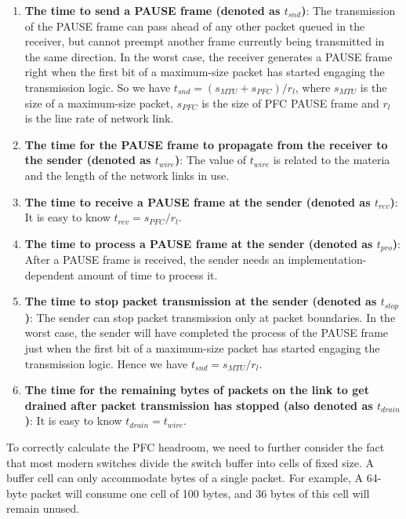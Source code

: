\begin{enumerate}
	
\item\textbf{The time to send a PAUSE frame (denoted as $t_{snd}$)}: The transmission of the PAUSE frame  can pass ahead of any other packet queued in the receiver, but cannot preempt another frame currently being transmitted in the same direction. In the worst case, the receiver generates a PAUSE frame right when the first bit of a maximum-size packet has started engaging the transmission logic. So we have  $t_{snd}=(s_{MTU}+s_{PFC})/r_{l}$, where $s_{MTU}$ is the size of a maximum-size packet, $s_{PFC}$ is the size of PFC PAUSE frame and $r_{l}$ is the line rate of network link.

\item\textbf{The time for the PAUSE frame to propagate from the receiver to the sender (denoted as $t_{wire}$)}: The value of  $t_{wire}$ is related to the materia and the length of the network links in use.

\item\textbf{The time to receive a PAUSE frame at the sender (denoted as $t_{rev}$)}: It is easy to know $t_{rev}=s_{PFC}/r_{l}$.

\item\textbf{The time to process a PAUSE frame at the sender (denoted as $t_{pro}$)}:  After a PAUSE frame is received, the sender needs an implementation-dependent amount of time to process it.

\item\textbf{The time to stop packet transmission at the sender (denoted as $t_{stop}$)}: The sender can stop packet transmission only at packet boundaries.  In the worst case, the sender will have completed the process of the PAUSE frame just when the first bit of a maximum-size packet has started engaging the  transmission logic. Hence we have  $t_{snd}=s_{MTU}/r_{l}$.

\item\textbf{The time for the remaining bytes of packets on the link to get drained after packet transmission has stopped (also denoted as $t_{drain}$)}: It is easy to know  $t_{drain}=t_{wire}$.

\end{enumerate}


 To correctly calculate the PFC headroom, we need to further consider the fact that most modern switches divide the switch buffer into cells of fixed size. A buffer cell can only accommodate bytes of a single packet. For example, A 64-byte packet will consume one cell of 100 bytes, and 36 bytes of this cell will remain unused.

